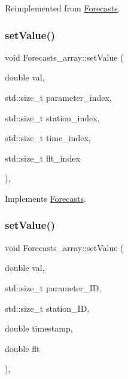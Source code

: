 Reimplemented from \mbox{\hyperlink{class_forecasts_addb1f75f0dc6833c466453c51256812c}{Forecasts}}.

\mbox{\label{class_forecasts__array_a19d59c93e8b7692ebae2d3e15dc43f87}} 
\subsubsection{\texorpdfstring{set\+Value()}{setValue()}\hspace{0.1cm}{\footnotesize\ttfamily [1/2]}}
{\footnotesize\ttfamily void Forecasts\+\_\+array\+::set\+Value (\begin{DoxyParamCaption}\item[{double}]{val,  }\item[{std\+::size\+\_\+t}]{parameter\+\_\+index,  }\item[{std\+::size\+\_\+t}]{station\+\_\+index,  }\item[{std\+::size\+\_\+t}]{time\+\_\+index,  }\item[{std\+::size\+\_\+t}]{flt\+\_\+index }\end{DoxyParamCaption})\hspace{0.3cm}{\ttfamily [override]}, {\ttfamily [virtual]}}



Implements \mbox{\hyperlink{class_forecasts_a4ce21957ef296384b1e251098db953bc}{Forecasts}}.

\mbox{\label{class_forecasts__array_a7224d8333630fcd162a1b69b49241d2f}} 
\subsubsection{\texorpdfstring{set\+Value()}{setValue()}\hspace{0.1cm}{\footnotesize\ttfamily [2/2]}}
{\footnotesize\ttfamily void Forecasts\+\_\+array\+::set\+Value (\begin{DoxyParamCaption}\item[{double}]{val,  }\item[{std\+::size\+\_\+t}]{parameter\+\_\+\+ID,  }\item[{std\+::size\+\_\+t}]{station\+\_\+\+ID,  }\item[{double}]{timestamp,  }\item[{double}]{flt }\end{DoxyParamCaption})\hspace{0.3cm}{\ttfamily [override]}, {\ttfamily [virtual]}}



